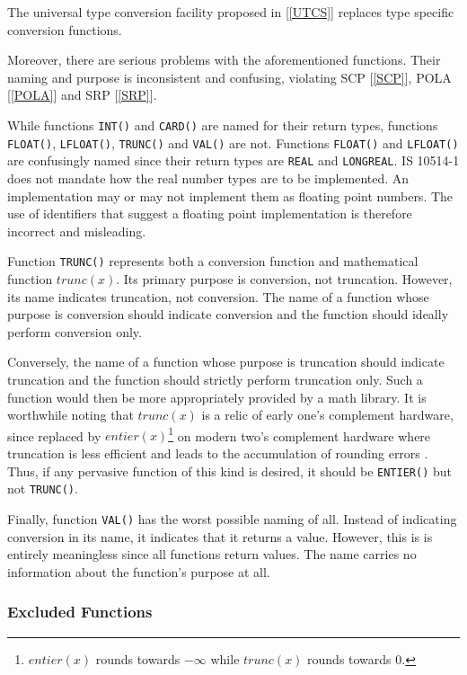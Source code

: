 \documentclass[10pt,a4paper,leqno,fleqn]{article}
\begin{document}
The universal type conversion facility proposed in
[\ref{UTCS}] replaces type specific conversion functions.

\noindent Moreover, there are serious problems with the aforementioned functions.
Their naming and purpose is inconsistent and confusing, violating
SCP [\ref{SCP}], POLA [\ref{POLA}] and SRP [\ref{SRP}].

While functions \verb|INT()| and \verb|CARD()| are named for their return types,
functions \verb|FLOAT()|, \verb|LFLOAT()|, \verb|TRUNC()| and \verb|VAL()| are not.
Functions \verb|FLOAT()| and \verb|LFLOAT()| are confusingly named since
their return types are \verb|REAL| and \verb|LONGREAL|. IS 10514-1 does not
mandate how the real number types are to be implemented. An implementation
may or may not implement them as floating point numbers. The use of identifiers
that suggest a floating point implementation is therefore incorrect and misleading.

Function \verb|TRUNC()| represents both a conversion function and
mathematical function $trunc(x)$. Its primary purpose is conversion, not truncation.
However, its name indicates truncation, not conversion. The name of a function
whose purpose is conversion should indicate conversion and the function should
ideally perform conversion only.

Conversely, the name of a function whose purpose is truncation should indicate
truncation and the function should strictly perform truncation only. Such a function
would then be more appropriately provided by a math library. It is worthwhile noting
that $trunc(x)$ is a relic of early one's complement hardware, since replaced
by $entier(x)$\footnote
{$entier(x)$ rounds towards $-\infty$ while $trunc(x)$ rounds towards $0$.}
on modern two's complement hardware where truncation is less
efficient and leads to the accumulation of rounding errors \cite{Tucker04}. Thus,
if any pervasive function of this kind is desired, it should be \verb|ENTIER()| but
not \verb|TRUNC()|.

Finally, function \verb|VAL()| has the worst possible naming of all.
Instead of indicating conversion in its name, it indicates that it returns a value.
However, this is is entirely meaningless since all functions return values. The
name carries no information about the function's purpose at all.


\subsubsection{Excluded Functions}
\end{document}
